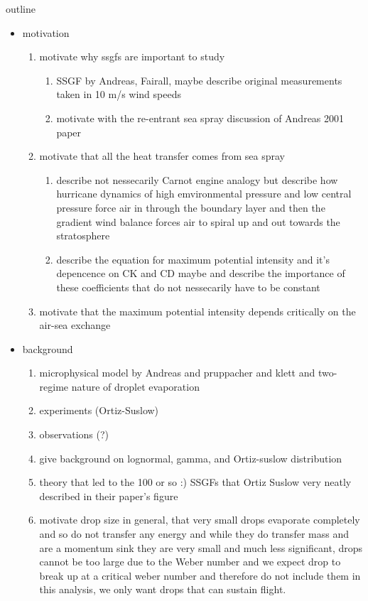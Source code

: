 \documentclass[10pt,a4paper]{article}
\begin{document}
outline
\begin{itemize}
\item motivation
\begin{enumerate}
\item
motivate why ssgfs are important to study
\begin{enumerate}
\item
SSGF by Andreas, Fairall, maybe describe original measurements taken in 10 m/s wind speeds
\item
motivate with the re-entrant sea spray discussion of Andreas 2001 paper
\end{enumerate}
\item
motivate that all the heat transfer comes from sea spray
\begin{enumerate}
\item
describe not nessecarily Carnot engine analogy but describe how hurricane dynamics of high emvironmental pressure and low central pressure force air in through the boundary layer and then the gradient wind balance forces air to spiral up and out towards the stratosphere
\item
describe the equation for maximum potential intensity and it's depencence on CK and CD maybe and describe the importance of these coefficients that do not nessecarily have to be constant
\end{enumerate}
\item motivate that the maximum potential intensity depends critically on the air-sea exchange
\end{enumerate}
\item
background
\begin{enumerate}
\item
microphysical model by Andreas and pruppacher and klett and two-regime nature of droplet evaporation
\item
experiments (Ortiz-Suslow)
\item
observations (?)
\item 
give background on lognormal, gamma, and Ortiz-suslow distribution
\item
theory that led to the 100 or so :) SSGFs that Ortiz Suslow very neatly described in their paper's figure
\item
motivate drop size in general, that very small drops evaporate completely and so do not transfer any energy and while they do transfer mass and are a momentum sink they are very small and much less significant, drops cannot be too large due to the Weber number and we expect drop to break up at a critical weber number and therefore do not include them in this analysis, we only want drops that can sustain flight.

\end{enumerate}
\end{itemize}
\end{document}
